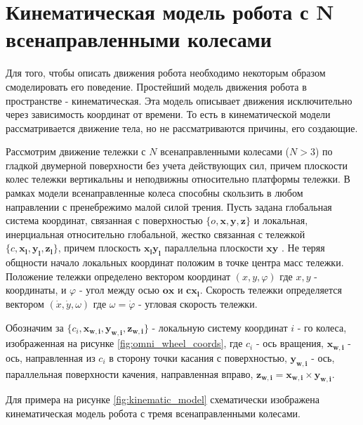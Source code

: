 \documentclass[oneside,final,14pt]{extreport}
\newcommand{\bs}{\boldsymbol}
\begin{document}
\chapter{Кинематическая модель робота с N всенаправленными колесами}   
Для того, чтобы описать движения робота необходимо некоторым образом смоделировать его поведение. Простейший модель движения робота в пространстве - кинематическая. Эта модель описывает движения исключительно через зависимость координат от времени. То есть в кинематической модели рассматривается движение тела, но не рассматриваются причины, его создающие.

Рассмотрим движение тележки с $N$ всенаправленными колесами ($N > 3$) по гладкой двумерной поверхности без учета действующих сил, причем плоскости колес тележки вертикальны и неподвижны относительно платформы тележки. В рамках модели всенаправленные колеса способны скользить в любом направлении с пренебрежимо малой силой трения. Пусть задана глобальная система координат, связанная с поверхностью $\{o,\boldsymbol{x},\bs{y},\bs{z}\}$ и локальная,  инерциальная относительно глобальной, жестко связанная с тележкой $\{c,\bs{x_{l}},\bs{y_{l}},\bs{z_{l}}\}$, причем плоскость $\bs{x_{l}}\bs{y_{l}}$  параллельна плоскости $\bs{x}\bs{y}$ . Не теряя общности начало локальных координат положим в точке центра масс тележки. Положение тележки определено вектором координат $(x,y,\varphi)$
где $x,y$ - координаты, и $\varphi$ -  угол между осью $\bs{ox}$ и $\bs{cx_{l}}$. Скорость тележки определяется вектором $(\dot{x},\dot{y},\omega)$ где $\omega = \dot{\varphi}$ - угловая скорость тележки. 

Обозначим за $\{c_{i},\bs{x_{w,i}},\bs{y_{w,i}},\bs{z_{w,i}}\}$ - локальную систему координат $i$ - го колеса, изображенная на рисунке \ref{fig:omni_wheel_coords}, где $c_{i}$ - ось вращения, $\bs{x_{w,i}}$  - ось, направленная из $c_{i}$  в сторону точки касания с поверхностью, $\bs{y_{w,i}}$ - ось, параллельная поверхности качения, направленная вправо, $\bs{z_{w,i}} = \bs{x_{w,i}} \times \bs{y_{w,i}}$.  

Для примера на рисунке \ref{fig:kinematic_model} схематически изображена кинематическая модель робота с тремя всенаправленными колесами.
\begin{figure}[H]
\end{figure}

\begin{figure}[H]
\end{figure}
\end{document}

